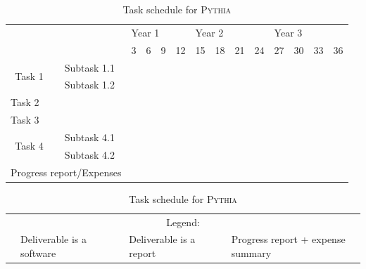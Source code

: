 \documentclass[a4paper,11pt,defblank]{article}
\newcommand{\pname}{\textsc{Pythia}\xspace}
\newcommand{\task}{\cellcolor{NavyBlue}\xspace}
\newcommand{\progress}{\cellcolor{Green}\xspace}
\newcommand{\delsoft}{\ding{74}\xspace}
\newcommand{\delreport}{\ding{45}\xspace}
\newcommand{\delexpense}{\ding{80}\xspace}
\begin{document}
\begin{table}[H]
  \begin{center}
    \begin{tabular} {|c|c|c|c|c|c||c|c|c|c||c|c|c|c|}
       \cline{3-14}
       \multicolumn{2}{c|}{}    & \multicolumn{4}{|l|}{Year 1 } &\multicolumn{4}{|l|}{Year 2 } & \multicolumn{4}{|l|}{Year 3}\\
              \cline{3-14}
       \multicolumn{2}{c|}{}  & 3 & 6 & 9 & 12 & 15 & 18 & 21 & 24 & 27 & 30 & 33 & 36\\\hline
      \multirow{2}{*}{ Task 1} & Subtask 1.1 & \task & \task \delsoft & \task & \task & \task \delsoft &  &  &  &  &  &  & \\
      & Subtask 1.2 & & \task & \task & \task & \task & \task \delsoft &  &  &  &  &  & \\\hline\hline
      \multicolumn{2}{|l|}{Task 2} & &  &  & & \task & \task & \task & \task \delsoft &  &  &  & \\\hline\hline
      \multicolumn{2}{|l|}{Task 3} & &  &  &  &  &  &  & \task & \task & \task \delsoft &  & \\\hline\hline
      \multirow{2}{*}{Task 4} & Subtask 4.1 & &  &  &  &  &  &  & & & \task & \task &\task \delreport\\
      & Subtask 4.2 & &  &  &  &  &  &  & & & \task & \task &\task \delsoft\\\hline\hline
      \multicolumn{2}{|l|}{Progress report/Expenses} & &  &  &  &  & \progress \delexpense&  & & & &  &\progress \delexpense \\\hline
    \end{tabular}

    \begin{tabular}{c l c l c l}\\
      \multicolumn{6}{c}{Legend:}\\
      \task \delsoft & Deliverable is a software & \task \delreport & Deliverable is a report & \progress \delexpense & Progress report + expense summary
    \end{tabular}
  \end{center}
  \caption{Task schedule for \pname}
  \label{tab:task_schedule}
\end{table}
\end{document}
